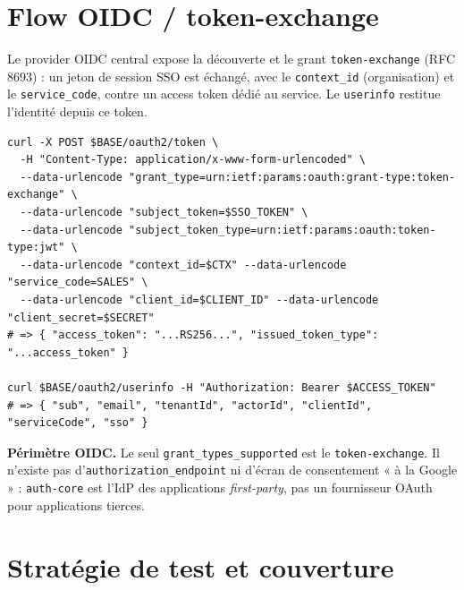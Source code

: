 \documentclass[11pt,a4paper,oneside]{report}
\newcommand{\code}[1]{\texttt{\small #1}}
\begin{document}
\chapter{Flow OIDC / token-exchange}
Le provider OIDC central expose la découverte et le grant \code{token-exchange} (RFC 8693) :
un jeton de session SSO est échangé, avec le \code{context\_id} (organisation) et le
\code{service\_code}, contre un access token dédié au service. Le \code{userinfo} restitue
l'identité depuis ce token.

\begin{lstlisting}[caption={Échange token-exchange puis userinfo.}]
curl -X POST $BASE/oauth2/token \
  -H "Content-Type: application/x-www-form-urlencoded" \
  --data-urlencode "grant_type=urn:ietf:params:oauth:grant-type:token-exchange" \
  --data-urlencode "subject_token=$SSO_TOKEN" \
  --data-urlencode "subject_token_type=urn:ietf:params:oauth:token-type:jwt" \
  --data-urlencode "context_id=$CTX" --data-urlencode "service_code=SALES" \
  --data-urlencode "client_id=$CLIENT_ID" --data-urlencode "client_secret=$SECRET"
# => { "access_token": "...RS256...", "issued_token_type": "...access_token" }

curl $BASE/oauth2/userinfo -H "Authorization: Bearer $ACCESS_TOKEN"
# => { "sub", "email", "tenantId", "actorId", "clientId", "serviceCode", "sso" }
\end{lstlisting}

\begin{notebox}
\textbf{Périmètre OIDC.} Le seul \code{grant\_types\_supported} est le \code{token-exchange}.
Il n'existe pas d'\code{authorization\_endpoint} ni d'écran de consentement « à la Google » :
\code{auth-core} est l'IdP des applications \emph{first-party}, pas un fournisseur OAuth pour
applications tierces.
\end{notebox}

\chapter{Stratégie de test et couverture}
\end{document}
